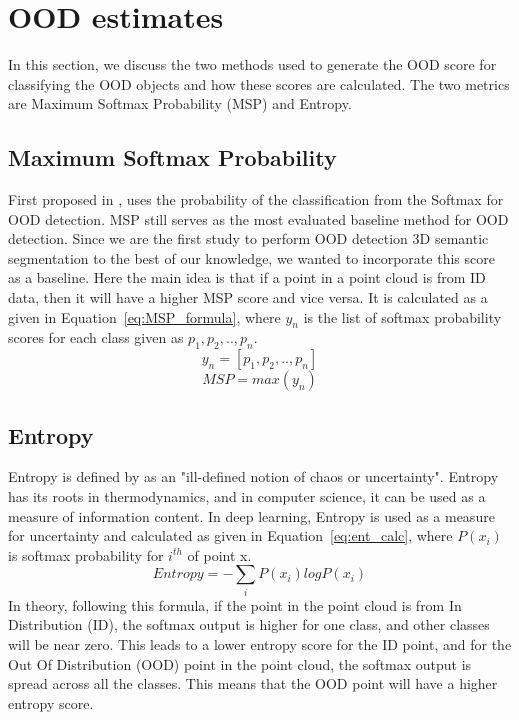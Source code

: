 \section{OOD estimates}
In this section, we discuss the two methods used to generate the OOD score for classifying the OOD objects and how these scores are calculated.
The two metrics are Maximum Softmax Probability (MSP) and Entropy.

\subsection{Maximum Softmax Probability}
First proposed in \cite{hendrycks2016baseline_MSP}, uses the probability of the classification from the Softmax for OOD detection. 
MSP still serves as the most evaluated baseline method for OOD detection.
Since we are the first study to perform OOD detection 3D semantic segmentation to the best of our knowledge, we wanted to incorporate this score as a baseline. 
Here the main idea is that if a point in a point cloud is from ID data, then it will have a higher MSP score and vice versa.
It is calculated as a given in Equation~\ref{eq:MSP_formula}, where $y_n$ is the list of softmax probability scores for each class given as $p_1, p_2, .., p_n$.
$$y_n = [p_1, p_2,..,p_n]$$
\begin{equation}
    MSP = max(y_n)
    \label{eq:MSP_formula}
\end{equation}

\subsection{Entropy}
\label{sec:meth_entropy}
Entropy is defined by \cite{entropy_robinson} as an "ill-defined notion of chaos or uncertainty".
Entropy has its roots in thermodynamics, and in computer science, it can be used as a measure of information content.
In deep learning, Entropy is used as a measure for uncertainty and calculated as given in Equation~\ref{eq:ent_calc}, where $P(x_i)$ is softmax probability for $i^{th}$ of point x.
\begin{equation}
    Entropy = -\sum_i P(x_i) log P(x_i)
    \label{eq:ent_calc}
\end{equation}
In theory, following this formula, if the point in the point cloud is from In Distribution (ID), the softmax output is higher for one class, and other classes will be near zero.
This leads to a lower entropy score for the ID point, and for the Out Of Distribution (OOD) point in the point cloud, the softmax output is spread across all the classes.
This means that the OOD point will have a higher entropy score.

